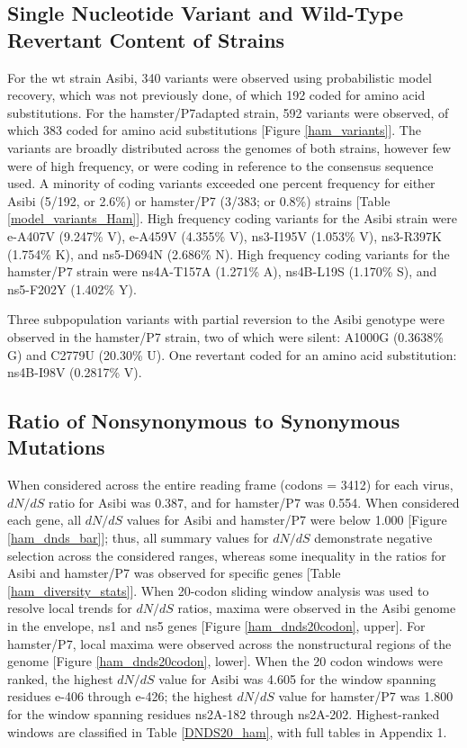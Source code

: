 \subsection{Single Nucleotide Variant and Wild-Type Revertant Content of Strains}
For the \gls{wt} strain Asibi, 340 variants were observed using probabilistic model recovery, which was not previously done, of which 192 coded for amino acid substitutions. For the hamster/P7adapted strain, 592 variants were observed, of which 383 coded for amino acid substitutions [Figure \ref{ham_variants}]. The variants are broadly distributed across the genomes of both strains, however few were of high frequency, or were coding in reference to the consensus sequence used. A minority of coding variants exceeded one percent frequency for either Asibi (5/192, or 2.6\%) or hamster/P7 (3/383; or 0.8\%) strains [Table \ref{model_variants_Ham}]. High frequency coding variants for the Asibi strain were \gls{e}-A407V (9.247\% V), \gls{e}-A459V (4.355\% V), \gls{ns}3-I195V (1.053\% V), \gls{ns}3-R397K (1.754\% K), and \gls{ns}5-D694N (2.686\% N). High frequency coding variants for the hamster/P7 strain were \gls{ns}4A-T157A (1.271\% A), \gls{ns}4B-L19S (1.170\% S), and \gls{ns}5-F202Y (1.402\% Y). 

Three subpopulation variants with partial reversion to the Asibi genotype were observed in the hamster/P7 strain, two of which were silent: A1000G (0.3638\% G) and C2779U (20.30\% U).  One revertant coded for an amino acid substitution: \gls{ns}4B-I98V (0.2817\% V). 
\subsection{Ratio of Nonsynonymous to Synonymous Mutations}
When considered across the entire reading frame (codons = 3412) for each virus, $dN/dS$ ratio for Asibi was 0.387, and for hamster/P7 was 0.554. When considered each gene, all $dN/dS$ values for Asibi and hamster/P7 were below 1.000 [Figure \ref{ham_dnds_bar}]; thus, all summary values for $dN/dS$ demonstrate negative selection across the considered ranges, whereas some inequality in the ratios for Asibi and hamster/P7 was observed for specific genes [Table \ref{ham_diversity_stats}]. When 20-codon sliding window analysis was used to resolve local trends for  $dN/dS$ ratios, maxima were observed in the Asibi genome in the envelope, \gls{ns}1 and \gls{ns}5 genes [Figure \ref{ham_dnds20codon}, upper]. For hamster/P7, local maxima were observed across the nonstructural regions of the genome [Figure \ref{ham_dnds20codon}, lower]. When the 20 codon windows were ranked, the highest $dN/dS$ value for Asibi was 4.605 for the window spanning residues \gls{e}-406 through \gls{e}-426; the highest $dN/dS$ value for hamster/P7 was 1.800 for the window spanning residues \gls{ns}2A-182 through \gls{ns}2A-202. Highest-ranked windows are classified in Table \ref{DNDS20_ham}, with full tables in Appendix 1.

